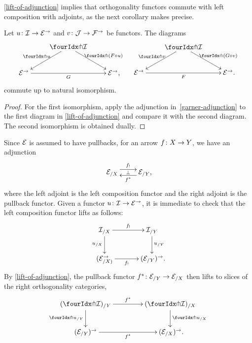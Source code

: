 \documentclass[reqno,10pt,a4paper,oneside,draft]{amsart}
\begin{document}
\cref{lift-of-adjunction} implies that orthogonality functors commute with left composition with adjoints, as the next corollary makes precise.

\begin{corollary} \label{pitchfork-adjunction}
Let $u \co \cal{I} \to \catE^\to$ and $v \co \cal{J} \to \cal{F}^\to$ be functors.
The diagrams
\begin{align*}
\xycenter{
  & \liftr{\cal{I}} 
  \ar[dr]^-{\liftr{(F \cc u)}}
  \ar[dl]_-{\liftr{u}} & 
\\
  \catE^\to
  \ar[rr]_-G
& & 
  \catE^\to
\rlap{,}}
&&
\xycenter{
  &  \liftl{\cal{I}}
  \ar[dl]_-{\liftl{v}}
  \ar[dr]^-{\liftl{(G \cc v)}} &
\\
  \catE^\to
  \ar[rr]_-{F}
& & 
  \catE^\to
\rlap{.}}
\end{align*}
commute up to natural isomorphism.
\end{corollary}

\begin{proof}
For the first isomorphism, apply the adjunction in~\eqref{garner-adjunction} to the first diagram in \cref{lift-of-adjunction} and compare it with the second diagram.
The second isomorphism is obtained dually.
\end{proof}

\begin{example} \label{exa:composition-pullback-lift} Since $\cal{E}$ is assumed to have pullbacks,
for an arrow $f \co X \to Y$, we have an adjunction
\[
\xymatrix{
\catE_{/X} \ar@<1ex>[r]^{f_{!}} \ar@{}[r]|{\bot} & \catE_{/Y} \rlap{,} \ar@<1ex>[l]^{f^*}}
\]
where the left adjoint is the left composition functor and the right adjoint is the pullback functor.
Given a functor $u \co \cal{I} \to \catE^\to$, it is immediate to check that the left composition functor lifts as follows:
\[
\xymatrix@C+1em{
  \cal{I}_{/X}
  \ar[r]^-{f_!}
  \ar[d]_{u_{/X}}
&
  \cal{I}_{/Y}
  \ar[d]^{u_{/Y}}
\\
  (\calE_{/X)}^\to
  \ar[r]_-{f_!}
&
  (\calE_{/Y})^\to \rlap{.}
}
\]
By \cref{lift-of-adjunction}, the pullback functor $f^* \co \catE_{/Y} \to \catE_{/X}$ then lifts to slices of the right orthogonality categories,
\[
\xymatrix@C=1.5cm{
   (\liftr{\cal{I}})_{/ Y}
 \ar[d]_{{\liftr{u}}_{/Y}}
  \ar[r]^{f^*}
&
  (\liftr{\cal{I}})_{/X}
 \ar[d]^{{\liftr{u}}_{/X}}
\\
 ({\catE}_{/Y})^\to
  \ar[r]_{f^*}
&
   (\catE_{/X})^\to \rlap{.}
}
\]
\end{example}

\end{document}
